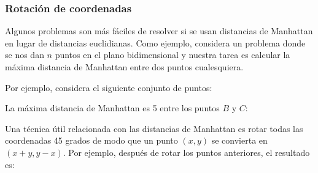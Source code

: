 \subsubsection{Rotación de coordenadas}

Algunos problemas son más fáciles de resolver si
se usan distancias de Manhattan en lugar de distancias euclidianas.
Como ejemplo, considera un problema donde se nos dan
$n$ puntos en el plano bidimensional
y nuestra tarea es calcular la máxima distancia de Manhattan
entre dos puntos cualesquiera.

Por ejemplo, considera el siguiente conjunto de puntos:
\begin{center}
\end{center}
La máxima distancia de Manhattan es 5
entre los puntos $B$ y $C$:
\begin{center}
\end{center}

Una técnica útil relacionada con las distancias de Manhattan
es rotar todas las coordenadas 45 grados de modo que
un punto $(x,y)$ se convierta en $(x+y,y-x)$.
Por ejemplo, después de rotar los puntos anteriores,
el resultado es:

